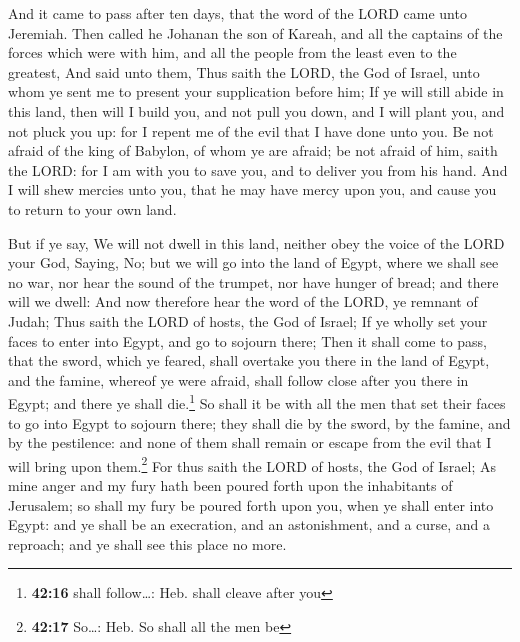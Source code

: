  And it came to pass after ten days, that the word of the
LORD came unto Jeremiah.  Then called he Johanan the son
of Kareah, and all the captains of the forces which were with him, and
all the people from the least even to the greatest,  And
said unto them, Thus saith the LORD, the God of Israel, unto whom ye
sent me to present your supplication before him;  If ye
will still abide in this land, then will I build you, and not pull you
down, and I will plant you, and not pluck you up: for I repent me of the
evil that I have done unto you.  Be not afraid of the
king of Babylon, of whom ye are afraid; be not afraid of him, saith the
LORD: for I am with you to save you, and to deliver you from his hand.
 And I will shew mercies unto you, that he may have mercy
upon you, and cause you to return to your own land.

 But if ye say, We will not dwell in this land, neither
obey the voice of the LORD your God,  Saying, No; but we
will go into the land of Egypt, where we shall see no war, nor hear the
sound of the trumpet, nor have hunger of bread; and there will we dwell:
 And now therefore hear the word of the LORD, ye remnant
of Judah; Thus saith the LORD of hosts, the God of Israel; If ye wholly
set your faces to enter into Egypt, and go to sojourn there;
 Then it shall come to pass, that the sword, which ye
feared, shall overtake you there in the land of Egypt, and the famine,
whereof ye were afraid, shall follow close after you there in Egypt; and
there ye shall die.\footnote{\textbf{42:16} shall follow\ldots: Heb.
  shall cleave after you}  So shall it be with all the
men that set their faces to go into Egypt to sojourn there; they shall
die by the sword, by the famine, and by the pestilence: and none of them
shall remain or escape from the evil that I will bring upon
them.\footnote{\textbf{42:17} So\ldots: Heb. So shall all the men be}
 For thus saith the LORD of hosts, the God of Israel; As
mine anger and my fury hath been poured forth upon the inhabitants of
Jerusalem; so shall my fury be poured forth upon you, when ye shall
enter into Egypt: and ye shall be an execration, and an astonishment,
and a curse, and a reproach; and ye shall see this place no more.

